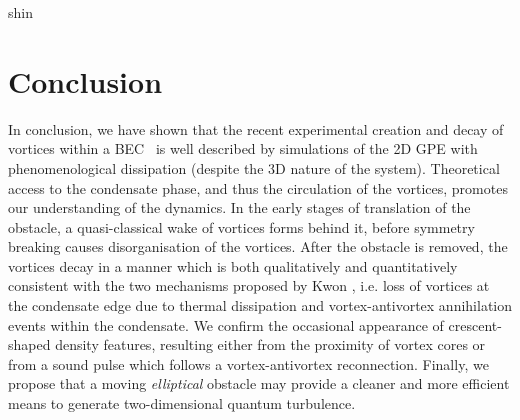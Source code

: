 \begin{chapter}{\label{cha:shin}shin}
\section{Conclusion}
In conclusion, we have shown that the recent experimental creation and decay of vortices within a BEC~\citep{kwon_moon_14} is well described by simulations of the 2D GPE with phenomenological dissipation (despite the 3D nature of the system).  Theoretical access to the condensate phase, and thus the circulation of the vortices, promotes our understanding of the dynamics.  In the early stages of 
translation of the obstacle, a quasi-classical wake of vortices 
forms behind it, before symmetry breaking causes disorganisation 
of the vortices.  After the obstacle is removed, 
the vortices decay in a manner which is both qualitatively and 
quantitatively consistent with the two mechanisms proposed by 
Kwon \etalcc, i.e. loss of vortices at the condensate edge due to thermal dissipation and vortex-antivortex 
annihilation events within the condensate. 
We confirm the occasional appearance of 
crescent-shaped density features, resulting either from the proximity 
of vortex cores or from a sound pulse which follows a 
vortex-antivortex reconnection.  Finally, we propose that a moving {\it elliptical} obstacle may provide a cleaner and more efficient means to generate two-dimensional quantum turbulence.
\end{chapter}

